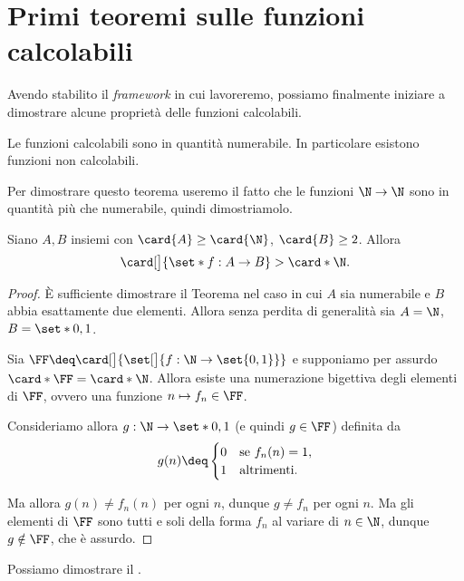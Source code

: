 \section{Primi teoremi sulle funzioni calcolabili}

Avendo stabilito il \emph{framework} in cui lavoreremo, possiamo finalmente iniziare a dimostrare alcune proprietà delle funzioni calcolabili.

\begin{theorem}
    Le funzioni calcolabili sono in quantità numerabile. In particolare esistono funzioni non calcolabili.
\end{theorem}

Per dimostrare questo teorema useremo il fatto che le funzioni $\N \to \N$ sono in quantità più che numerabile, quindi dimostriamolo.

\begin{theorem}
    Siano $A, B$ insiemi con $\card{A} \geq \card{\N}$, $\card{B} \geq 2$. Allora \[
        \card[\big]{\set*{f : A \to B}} > \card*{\N}.
    \]  
\end{theorem}
\begin{proof}
    È sufficiente dimostrare il Teorema nel caso in cui $A$ sia numerabile e $B$ abbia esattamente due elementi. Allora senza perdita di generalità sia $A = \N$, $B = \set*{0, 1}$.
    
    Sia $\FF \deq \card[\big]{\set[\big]{f : \N \to \set{0, 1}}}$ e supponiamo per assurdo $\card*{\FF} = \card*{\N}$. Allora esiste una numerazione bigettiva degli elementi di $\FF$, ovvero una funzione $n \mapsto f_n \in \FF$.
    
    Consideriamo allora $g : \N \to \set*{0, 1}$ (e quindi $g \in \FF$) definita da \[
        g(n) \deq \begin{cases}
            0 &\text{se } f_n(n) = 1,\\
            1 &\text{altrimenti}.
        \end{cases}
    \] 

    Ma allora $g(n) \neq f_n(n)$ per ogni $n$, dunque $g \neq f_n$ per ogni $n$. Ma gli elementi di $\FF$ sono tutti e soli della forma $f_n$ al variare di $n \in \N$, dunque $g \notin \FF$, che è assurdo.   
\end{proof}

Possiamo dimostrare il .


